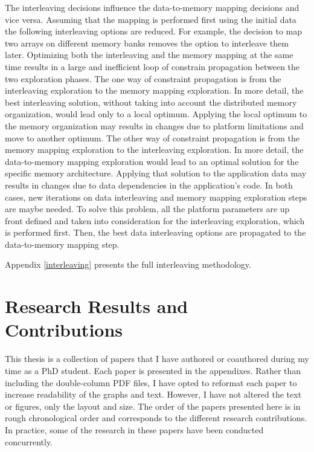 The interleaving decisions influence the data-to-memory mapping decisions and vice versa.
Assuming that the mapping is performed first using the initial data the following interleaving options are reduced.
For example, the decision to map two arrays on different memory banks removes the option to interleave them later.
Optimizing both the interleaving and the memory mapping at the same time results in a large and inefficient loop of constrain propagation between the two exploration phases.
The one way of constraint propagation is from the interleaving exploration to the memory mapping exploration.
In more detail, the best interleaving solution, without taking into account the distributed memory organization, would lead only to a local optimum.
Applying the local optimum to the memory organization may results in changes due to platform limitations and move to another optimum.
The other way of constraint propagation is from the memory mapping exploration to the interleaving exploration.
In more detail, the data-to-memory mapping exploration would lead to an optimal solution for the specific memory architecture.
Applying that solution to the application data may results in changes due to data dependencies in the application's code.
In both cases, new iterations on data interleaving and memory mapping exploration steps are maybe needed.
To solve this problem, all the platform parameters are up front defined and taken into consideration for the interleaving exploration, which is performed first.
Then, the best data interleaving options are propagated to the data-to-memory mapping step.

Appendix \ref{interleaving} presents the full interleaving methodology.

\chapter{Research Results and Contributions}
\label{research}

This thesis is a collection of papers that I have authored or coauthored during my time as a PhD student. 
Each paper is presented in the appendixes. 
Rather than including the double-column PDF files, I have opted to reformat each paper to increase readability of the graphs and text. 
However, I have not altered the text or figures, only the layout and size.
The order of the papers presented here is in rough chronological order and corresponds to the different research contributions. 
In practice, some of the research in these papers have been conducted concurrently.

